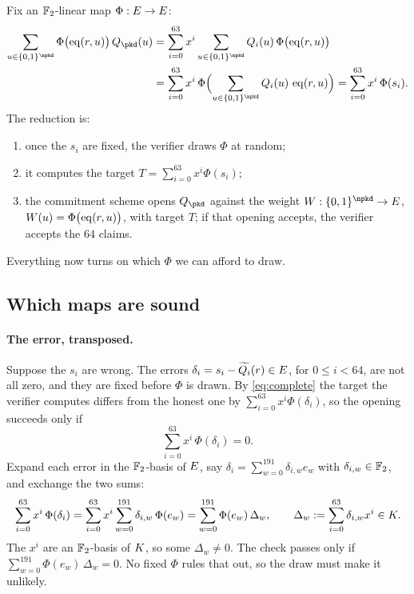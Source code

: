 Fix an $\mathbb{F}_2$-linear map $\Phi:E\to E$:
\begin{equation}
\begin{split}
\sum_{u\in\cube{\npkd}}\Phi\bigl(\eq(r,u)\bigr)\,Q_\pkd(u)
&=\sum_{i=0}^{63}x^i\sum_{u\in\cube{\npkd}}Q_i(u)\,\Phi\bigl(\eq(r,u)\bigr)\\
&=\sum_{i=0}^{63}x^i\,\Phi\Bigl(\sum_{u\in\cube{\npkd}}Q_i(u)\,\eq(r,u)\Bigr)
=\sum_{i=0}^{63}x^i\,\Phi(s_i).
\end{split}
\label{eq:complete}
\end{equation}
The reduction is:
\begin{enumerate}
\item once the $s_i$ are fixed, the verifier draws $\Phi$ at random;
\item it computes the target $T=\sum_{i=0}^{63}x^i\Phi(s_i)$;
\item the commitment scheme opens $Q_\pkd$ against the weight $W:\cube{\npkd}\to\E$, $W(u)=\Phi\bigl(\operatorname{eq}(r,u)\bigr)$, with target $T$; if that opening accepts, the verifier accepts the $64$ claims.
\end{enumerate}
Everything now turns on which $\Phi$ we can afford to draw.

\subsection{Which maps are sound}\label{rs:sound-maps}

\paragraph{The error, transposed.} Suppose the $s_i$ are wrong. The errors $\delta_i=s_i-\widetilde{Q_i}(r)\in E$, for $0\le i<64$, are not all zero, and they are fixed before $\Phi$ is drawn. By \eqref{eq:complete} the target the verifier computes differs from the honest one by $\sum_{i=0}^{63}x^i\Phi(\delta_i)$, so the opening succeeds only if
\[
\sum_{i=0}^{63}x^i\,\Phi(\delta_i)=0.
\]
Expand each error in the $\mathbb{F}_2$-basis of $E$, say $\delta_i=\sum_{w=0}^{191}\delta_{i,w}e_w$ with $\delta_{i,w}\in\mathbb{F}_2$, and exchange the two sums:
\begin{equation}
\sum_{i=0}^{63}x^i\,\Phi(\delta_i)
=\sum_{i=0}^{63}x^i\sum_{w=0}^{191}\delta_{i,w}\,\Phi(e_w)
=\sum_{w=0}^{191}\Phi(e_w)\,\Delta_w,
\qquad
\Delta_w:=\sum_{i=0}^{63}\delta_{i,w}x^i\in K.
\label{eq:transpose}
\end{equation}
The $x^i$ are an $\mathbb{F}_2$-basis of $K$, so some $\Delta_w\neq0$. The check passes only if $\sum_{w=0}^{191}\Phi(e_w)\,\Delta_w=0$. No fixed $\Phi$ rules that out, so the draw must make it unlikely.

